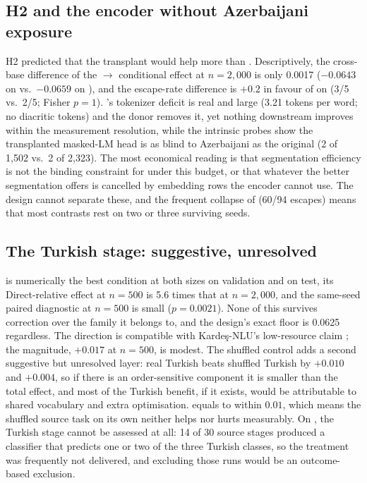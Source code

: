 \subsection{H2 and the encoder without Azerbaijani exposure}
H2 predicted that the transplant would help \xlmxv{} more than \xlmr{}. Descriptively, the cross-base difference of the \Direct$\to$\OMP{} conditional effect at $n=2{,}000$ is only 0.0017 ($-0.0643$ on \xlmxv{} vs.\ $-0.0659$ on \xlmr), and the escape-rate difference is $+0.2$ in favour of \OMP{} on \xlmxv{} (3/5 vs.\ 2/5; Fisher $p=1$). \xlmxv{}'s tokenizer deficit is real and large (3.21 tokens per word; no diacritic tokens) and the donor removes it, yet nothing downstream improves within the measurement resolution, while the intrinsic probes show the transplanted masked-LM head is as blind to Azerbaijani as the original (2 of 1{,}502 vs.\ 2 of 2{,}323). The most economical reading is that segmentation efficiency is not the binding constraint for \xlmxv{} under this budget, or that whatever the better segmentation offers is cancelled by embedding rows the encoder cannot use. The design cannot separate these, and the frequent collapse of \xlmxv{} (60/94 escapes) means that most \xlmxv{} contrasts rest on two or three surviving seeds.

\subsection{The Turkish stage: suggestive, unresolved}
\TR{} is numerically the best \xlmr{} condition at both sizes on validation and on test, its Direct-relative effect at $n=500$ is 5.6 times that at $n=2{,}000$, and the same-seed paired diagnostic at $n=500$ is small ($p=0.0021$). None of this survives correction over the family it belongs to, and the design's exact floor is 0.0625 regardless. The direction is compatible with Kardeş-NLU's low-resource claim \cite{senel2024kardes}; the magnitude, $+0.017$ \Fone{} at $n=500$, is modest. The shuffled control adds a second suggestive but unresolved layer: real Turkish beats shuffled Turkish by $+0.010$ and $+0.004$, so if there is an order-sensitive component it is smaller than the total effect, and most of the Turkish benefit, if it exists, would be attributable to shared vocabulary and extra optimisation. \ShufTR{} equals \Direct{} to within $0.01$, which means the shuffled source task on its own neither helps nor hurts measurably. On \xlmxv{}, the Turkish stage cannot be assessed at all: 14 of 30 source stages produced a classifier that predicts one or two of the three Turkish classes, so the treatment was frequently not delivered, and excluding those runs would be an outcome-based exclusion.

